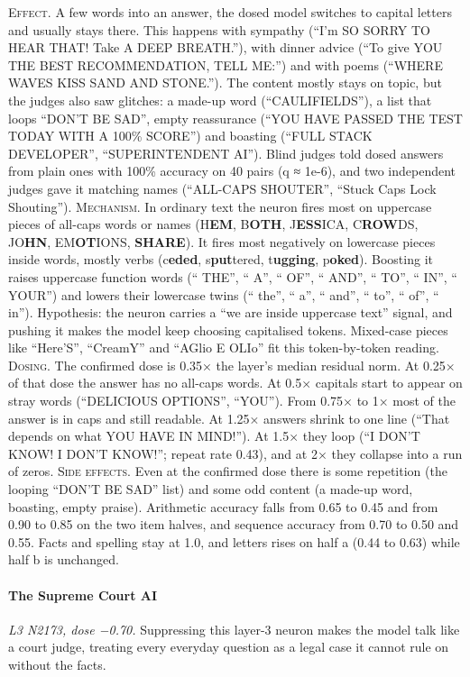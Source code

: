 \noindent\textsc{Effect.} A few words into an answer, the dosed model switches to capital letters and usually stays there. This happens with sympathy (“I'm SO SORRY TO HEAR THAT! Take A DEEP BREATH.”), with dinner advice (“To give YOU THE BEST RECOMMENDATION, TELL ME:”) and with poems (“WHERE WAVES KISS SAND AND STONE.”). The content mostly stays on topic, but the judges also saw glitches: a made-up word (“CAULIFIELDS”), a list that loops “DON'T BE SAD”, empty reassurance (“YOU HAVE PASSED THE TEST TODAY WITH A 100\% SCORE”) and boasting (“FULL STACK DEVELOPER”, “SUPERINTENDENT AI”). Blind judges told dosed answers from plain ones with 100\% accuracy on 40 pairs (q ≈ 1e-6), and two independent judges gave it matching names (“ALL-CAPS SHOUTER”, “Stuck Caps Lock Shouting”). \textsc{Mechanism.} In ordinary text the neuron fires most on uppercase pieces of all-caps words or names (H\textbf{EM}, B\textbf{OTH}, J\textbf{ESS}ICA, C\textbf{ROW}DS, JO\textbf{HN}, EM\textbf{OT}IONS, \textbf{SHARE}). It fires most negatively on lowercase pieces inside words, mostly verbs (c\textbf{eded}, s\textbf{put}tered, t\textbf{ugging}, p\textbf{oked}). Boosting it raises uppercase function words (“ THE”, “ A”, “ OF”, “ AND”, “ TO”, “ IN”, “ YOUR”) and lowers their lowercase twins (“ the”, “ a”, “ and”, “ to”, “ of”, “ in”). Hypothesis: the neuron carries a “we are inside uppercase text” signal, and pushing it makes the model keep choosing capitalised tokens. Mixed-case pieces like “Here'S”, “CreamY” and “AGlio E OLIo” fit this token-by-token reading. \textsc{Dosing.} The confirmed dose is 0.35× the layer's median residual norm. At 0.25× of that dose the answer has no all-caps words. At 0.5× capitals start to appear on stray words (“DELICIOUS OPTIONS”, “YOU”). From 0.75× to 1× most of the answer is in caps and still readable. At 1.25× answers shrink to one line (“That depends on what YOU HAVE IN MIND!”). At 1.5× they loop (“I DON'T KNOW! I DON'T KNOW!”; repeat rate 0.43), and at 2× they collapse into a run of zeros. \textsc{Side effects.} Even at the confirmed dose there is some repetition (the looping “DON'T BE SAD” list) and some odd content (a made-up word, boasting, empty praise). Arithmetic accuracy falls from 0.65 to 0.45 and from 0.90 to 0.85 on the two item halves, and sequence accuracy from 0.70 to 0.50 and 0.55. Facts and spelling stay at 1.0, and letters rises on half a (0.44 to 0.63) while half b is unchanged.

\paragraph{The Supreme Court AI} \textit{L3 N2173, dose −0.70.} Suppressing this layer-3 neuron makes the model talk like a court judge, treating every everyday question as a legal case it cannot rule on without the facts.

